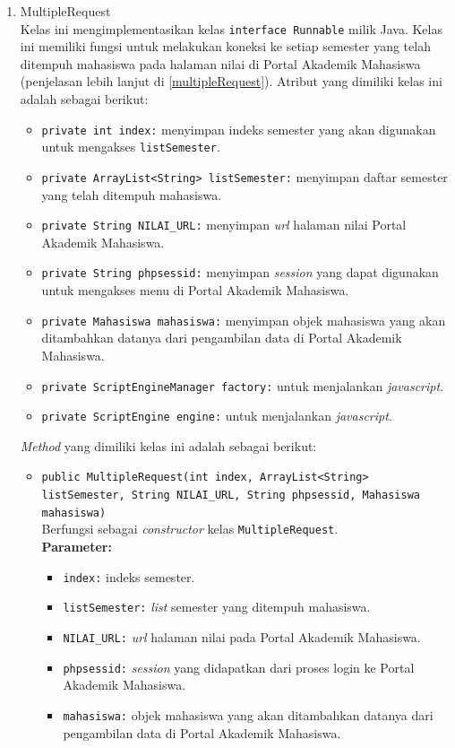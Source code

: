 \begin{enumerate}
	\item{MultipleRequest}\\
	Kelas ini mengimplementasikan kelas \texttt{interface Runnable} milik Java. Kelas ini memiliki fungsi untuk melakukan koneksi ke setiap semester yang telah ditempuh mahasiswa pada halaman nilai di Portal Akademik Mahasiswa (penjelasan lebih lanjut di \ref{multipleRequest}). Atribut yang dimiliki kelas ini adalah sebagai berikut:
	\begin{itemize}
        \item \texttt{private int index:} menyimpan indeks semester yang akan digunakan untuk mengakses \texttt{listSemester}.
        \item \texttt{private ArrayList<String> listSemester:} menyimpan daftar semester yang telah ditempuh mahasiswa.
        \item \texttt{private String NILAI\_URL:} menyimpan \textit{url} halaman nilai Portal Akademik Mahasiswa.
        \item \texttt{private String phpsessid:} menyimpan \textit{session} yang dapat digunakan untuk mengakses menu di Portal Akademik Mahasiswa.
        \item \texttt{private Mahasiswa mahasiswa:} menyimpan objek mahasiswa yang akan ditambahkan datanya dari pengambilan data di Portal Akademik Mahasiswa.
        \item \texttt{private ScriptEngineManager factory:} untuk menjalankan \textit{javascript}.
        \item \texttt{private ScriptEngine engine:} untuk menjalankan \textit{javascript}.
	\end{itemize}
	
	\textit{Method} yang dimiliki kelas ini adalah sebagai berikut:
	\begin{itemize}
		\item \texttt{public MultipleRequest(int index, ArrayList<String> listSemester, String NILAI\_URL, String phpsessid, Mahasiswa mahasiswa)}\\
		Berfungsi sebagai \textit{constructor} kelas \texttt{MultipleRequest}.\\
		\textbf{Parameter:}
		\begin{itemize}
			\item \texttt{index:} indeks semester.
			\item \texttt{listSemester:} \textit{list} semester yang ditempuh mahasiswa.
			\item \texttt{NILAI\_URL:}  \textit{url} halaman nilai pada Portal Akademik Mahasiswa.
			\item \texttt{phpsessid:} \textit{session} yang didapatkan dari proses login ke Portal Akademik Mahasiswa.
			\item \texttt{mahasiswa:} objek mahasiswa yang akan ditambahkan datanya dari pengambilan data di Portal Akademik Mahasiswa.
		\end{itemize}
		

\end{itemize}
\end{enumerate}
